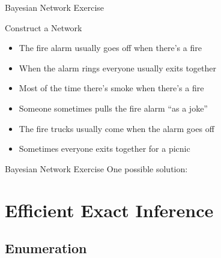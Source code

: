 \documentclass[14pt]{beamer}
\begin{document}
\begin{frame}{Bayesian Network Exercise}
	\begin{block}{Construct a Network}
		\begin{itemize}
			\item The fire alarm usually goes off when there's a fire
			\item When the alarm rings everyone usually exits together
			\item Most of the time there's smoke when there's a fire
			\item Someone sometimes pulls the fire alarm ``as a joke''
			\item The fire trucks usually come when the alarm goes off
			\item Sometimes everyone exits together for a picnic
		\end{itemize}
	\end{block}
\end{frame}

\begin{frame}[label=network-exercise-solution]{Bayesian Network Exercise}
One possible solution:
\begin{center}
\end{center}
\end{frame}

\section{Efficient Exact Inference}

\subsection{Enumeration}
\end{document}
